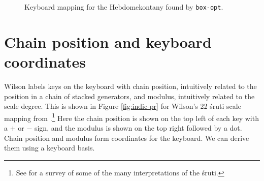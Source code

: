 \documentclass[a4paper,11pt]{article}
\begin{document}
\begin{figure}

\caption{Keyboard mapping for the Hebdomekontany found by \texttt{box-opt}.}
\label{fig:heb}
\end{figure}
\restoregeometry

\section{Chain position and keyboard coordinates}
\label{chain_position}

Wilson labels keys on the keyboard with chain position, intuitively related to
the position in a chain of stacked generators, and modulus, intuitively related
to the scale degree. This is shown in Figure \ref{fig:indic-pr} for Wilson's 22
\'{s}ruti scale mapping from \cite{wilson1974bosanquet}.\footnote{See
\cite{levy1982intonation} for a survey of some of the many interpretations of
the \'{s}ruti.} Here the chain position is shown on the top left of each key
with a $+$ or $-$ sign, and the modulus is shown on the top right followed by a
dot. Chain position and modulus form coordinates for the keyboard. We can
derive them using a keyboard basis.
\end{document}
